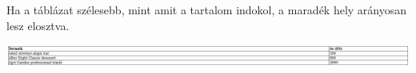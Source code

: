 \begin{frame}
  Ha a táblázat szélesebb, mint amit a tartalom indokol, a maradék hely arányosan lesz elosztva.
  \begin{exampleblock}{}
    \scriptsize
    
  \end{exampleblock}
  \begin{center}
    \includegraphics[width=\textwidth]{tablazat09.png}
  \end{center}
\end{frame}
